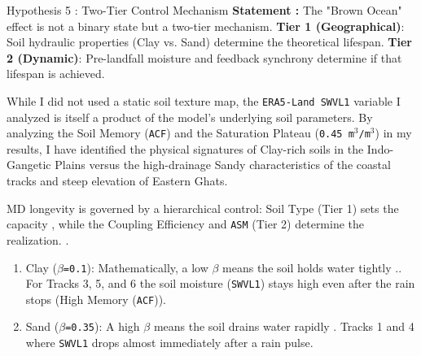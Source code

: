 \begin{frame}{Hypothesis 5 : Two-Tier Control Mechanism}
	\vspace{-0.3cm}
	\footnotesize
	\textbf{Statement :} The "Brown Ocean" effect is not a binary state but a two-tier mechanism. \textbf{Tier 1 (Geographical)}: Soil hydraulic properties (Clay vs. Sand) determine the theoretical lifespan. \textbf{Tier 2 (Dynamic)}: Pre-landfall moisture and feedback synchrony determine if that lifespan is achieved.

	\vspace{0.2cm}
	\tiny
	While I did not used a static soil texture map, the \texttt{ERA5-Land SWVL1} variable I analyzed is itself a product of the model's underlying soil parameters. By analyzing the Soil Memory (\texttt{ACF}) and the Saturation Plateau (\texttt{0.45 m$^3$/m$^3$}) in my results, I have identified the physical signatures of Clay-rich soils in the Indo-Gangetic Plains versus the high-drainage Sandy characteristics of the coastal tracks and steep elevation of Eastern Ghats.

	\vspace{0.05cm}
	\begin{block}{\footnotesize MD longevity is governed by a hierarchical control: Soil Type (Tier 1) sets the capacity \cite{seneviratne2010investigating}, while the Coupling Efficiency and \texttt{ASM} (Tier 2) determine the realization. \cite{hunt2017effect} \cite{kishtawal2013enhancement}.}\end{block}

	\vspace{0.05cm}
	\begin{enumerate}
		\item Clay (\texttt{$\beta$=0.1}): Mathematically, a low $\beta$ means the soil holds water tightly \cite{clapp1978empirical}.. For Tracks 3, 5, and 6 the soil moisture (\texttt{SWVL1}) stays high even after the rain stops (High Memory (\texttt{ACF})).
		\item Sand (\texttt{$\beta$=0.35}): A high $\beta$ means the soil drains water rapidly \cite{seneviratne2010investigating}. Tracks 1 and 4 where \texttt{SWVL1} drops almost immediately after a rain pulse.
	\end{enumerate}


\end{frame}
